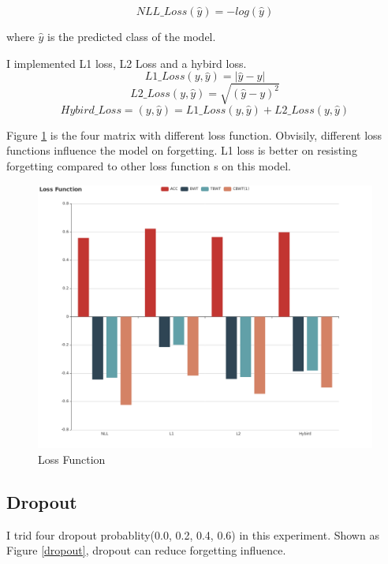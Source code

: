 \documentclass{article}
\begin{document}
$$NLL\_Loss(\hat{y}) = -log(\hat{y})$$

where $\hat{y}$ is the predicted class of the model.

I implemented L1 loss, L2 Loss and a hybird loss.
$$L1\_Loss(y, \hat{y}) = |\hat{y} - y|$$
$$L2\_Loss(y, \hat{y}) = \sqrt{(\hat{y} - y)^2}$$
$$Hybird\_Loss = (y, \hat{y}) =  L1\_Loss(y, \hat{y}) + L2\_Loss(y, \hat{y}) $$

Figure \ref{loss} is the four matrix with different loss function. Obvisily, different loss functions influence the model on forgetting. L1 loss is better on resisting forgetting compared to other loss function s on this model.

\begin{figure}[htbp]
\centering
\includegraphics[scale=0.3]{img/LossFunction.png}
\caption{Loss Function}
\label{loss}
\end{figure}

\subsection{Dropout}
I trid four dropout probablity(0.0, 0.2, 0.4, 0.6) in this experiment. Shown as Figure \ref{dropout}, dropout can reduce forgetting influence.
\end{document}
